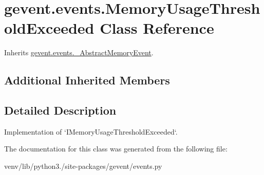 \hypertarget{classgevent_1_1events_1_1_memory_usage_threshold_exceeded}{}\section{gevent.\+events.\+Memory\+Usage\+Threshold\+Exceeded Class Reference}
\label{classgevent_1_1events_1_1_memory_usage_threshold_exceeded}


Inherits \hyperlink{classgevent_1_1events_1_1___abstract_memory_event}{gevent.\+events.\+\_\+\+Abstract\+Memory\+Event}.

\subsection*{Additional Inherited Members}


\subsection{Detailed Description}
\begin{DoxyVerb}Implementation of `IMemoryUsageThresholdExceeded`.
\end{DoxyVerb}
 

The documentation for this class was generated from the following file\+:\begin{DoxyCompactItemize}
\item 
venv/lib/python3./site-\/packages/gevent/events.\+py\end{DoxyCompactItemize}
